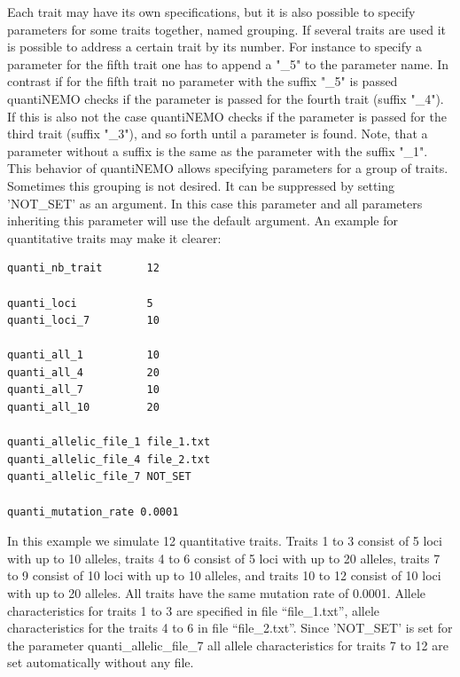 \documentclass[letterpaper,12pt,oneside]{book}
\begin{document}
Each trait may have its own specifications, but it is also possible to specify parameters for some traits together, named grouping. If several traits are used it is possible to address a certain trait by its number. For instance to specify a parameter for the fifth trait one has to append a \textsf{"\_5"} to the parameter name. In contrast if for the fifth trait no parameter with the suffix \textsf{"\_5"} is passed quantiNEMO checks if the parameter is passed for the fourth trait (suffix \textsf{"\_4"}). If this is also not the case quantiNEMO checks if the parameter is passed for the third trait (suffix \textsf{"\_3"}), and so forth until a parameter is found. Note, that a parameter without a suffix is the same as the parameter with the suffix  \textsf{"\_1"}. This behavior of quantiNEMO allows specifying parameters for a group of traits. Sometimes this grouping is not desired. It can be suppressed by setting 'NOT\_SET' as an argument. In this case this parameter and all parameters inheriting this parameter will use the default argument. An example for quantitative traits may make it clearer:
\begin{lstlisting}[frame=single]
quanti_nb_trait       12
	
quanti_loci           5
quanti_loci_7         10

quanti_all_1          10
quanti_all_4          20
quanti_all_7          10
quanti_all_10         20

quanti_allelic_file_1 file_1.txt  
quanti_allelic_file_4 file_2.txt  
quanti_allelic_file_7 NOT_SET  

quanti_mutation_rate 0.0001
\end{lstlisting} 
In this example we simulate 12 quantitative traits. Traits 1 to 3 consist of 5 loci with up to 10 alleles, traits 4 to 6 consist of 5 loci with up to 20 alleles, traits 7 to 9 consist of 10 loci with up to 10 alleles, and traits 10 to 12 consist of 10 loci with up to 20 alleles. All traits have the same mutation rate of 0.0001. Allele characteristics for traits 1 to 3 are specified in file “file\_1.txt”, allele characteristics for the traits 4 to 6 in file “file\_2.txt”. Since 'NOT\_SET' is set for the parameter \textsf{ quanti\_allelic\_file\_7} all allele characteristics for traits 7 to 12 are set automatically without any file. \\


\newpage
\end{document}
